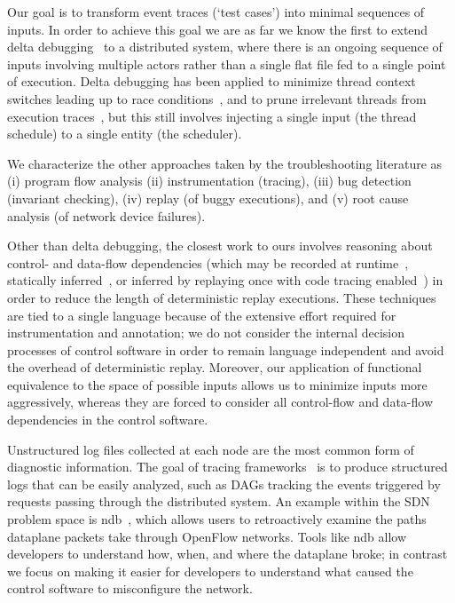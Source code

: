 Our goal is to transform
event traces (`test cases') into minimal sequences of inputs.
In order to achieve this goal we are as far we know the first to
extend delta debugging~\cite{Zeller:1999:YMP:318773.318946,Zeller:2002:SIF:506201.506206}
to a distributed system, where there is an ongoing sequence of inputs
involving multiple actors rather than a single flat file fed to a single point of
execution. Delta debugging has been applied to minimize thread context switches
leading up to race conditions~\cite{choi2002isolating}, and to
prune irrelevant threads from execution traces~\cite{huang2012lean}, but this still
involves injecting a single input (the thread schedule) to a single entity (the
scheduler).

We characterize the other approaches taken by the troubleshooting literature
as (i) program flow analysis (ii) instrumentation (tracing),
(iii) bug detection (invariant checking),
(iv) replay (of buggy executions), and
(v) root cause analysis (of network device failures).

\vspace{0.05in}
 Other than delta debugging,
the closest work to ours involves reasoning about
control- and data-flow dependencies
(which may be recorded at runtime~\cite{Lee:2011:TGR:1993498.1993528},
statically inferred~\cite{huang2012lean}, or
inferred by replaying once with code tracing enabled~\cite{tallam2007enabling})
in order to reduce the length of deterministic replay executions. These
techniques are tied to a single language because of the extensive effort
required for instrumentation and annotation; we do not consider the internal
decision processes of control software in order to remain language
independent and avoid the overhead of deterministic replay. %
Moreover, our application of functional equivalence to the space of
possible inputs allows us to minimize
inputs more aggressively, whereas they are forced to consider all control-flow
and data-flow dependencies in the control software.

\vspace{0.05in}
 Unstructured
log files collected at each node are the most common form of diagnostic information. The goal of
tracing frameworks~\cite{pip,fonseca2007x,Chen02pinpoint:problem,ndb14,barham2004using}
is to produce structured logs that can be easily analyzed, such as DAGs tracking the events triggered by
requests passing through the distributed system. An example within the SDN
problem space is ndb~\cite{ndb14}, which
allows users to retroactively examine the paths dataplane packets
take through OpenFlow networks. Tools like ndb allow developers to understand
how, when, and where the dataplane broke; in contrast we focus on making it
easier for developers to understand what caused the control software to
misconfigure the network. %

